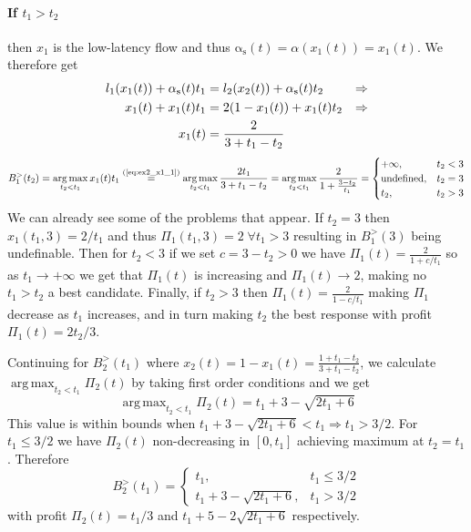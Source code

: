\documentclass[10pt,a4paper]{book}
\newcommand{\indeq}[1]{\stackrel{\text{#1}}{=}}
\newcommand{\as}{\mathrm{\alpha_s}}
\DeclareMathOperator*{\argmax}{arg\,max}
\theoremstyle{definition}
\theoremstyle{comment}
\begin{document}
\paragraph{If $t_1 > t_2$}
then $x_1$ is the low-latency flow and thus $\as(t) = \alpha(x_1(t)) = x_1(t)$.
We therefore get
\begin{align}
	l_1(x_1(t)) + \as(t) t_1 &= l_2(x_2(t)) + \as(t) t_2 &\Rightarrow \notag \\
	x_1(t) + x_1(t) t_1 &= 2 (1 - x_1(t)) + x_1(t) t_2 &\Rightarrow \notag \\
	x_1(t) &= \frac{2}{3 + t_1 - t_2} \label{eq:ex2_x1_1}
\end{align}
\[
	B_1^>(t_2) = \argmax_{t_2 < t_1} x_1(t) t_1 \indeq{(\ref{eq:ex2_x1_1})} \argmax_{t_2 < t_1} \frac{2 t_1}{3 + t_1 - t_2} = \argmax_{t_2 < t_1} \frac{2}{1 + \frac{3 - t_2}{t_1}} =
		\begin{cases}
			+\infty, & t_2 < 3 \\
			\textrm{undefined}, & t_2 = 3 \\
			t_2, & t_2 > 3 \\
		\end{cases}
\]
We can already see some of the problems that appear.
If $t_2 = 3$ then $x_1(t_1, 3) = 2/t_1$ and thus $\Pi_1(t_1, 3) = 2 \; \forall t_1 > 3$ resulting in $B_1^>(3)$ being undefinable.
Then for $t_2 < 3$ if we set $c = 3 - t_2 > 0$ we have $\Pi_1(t) = \frac{2}{1 + c/t_1}$ so as $t_1 \rightarrow +\infty$ we get that $\Pi_1(t)$ is increasing and $\Pi_1(t) \rightarrow 2$, making no $t_1 > t_2$ a best candidate.
Finally, if $t_2 > 3$ then $\Pi_1(t) = \frac{2}{1 - c/t_1}$ making $\Pi_1$ decrease as $t_1$ increases, and in turn making $t_2$ the best response with profit $\Pi_1(t) = {2 t_2}/3$.

Continuing for $B_2^>(t_1)$ where $x_2(t) = 1 - x_1(t) = \frac{1 + t_1 - t_2}{3 + t_1 - t_2}$, we calculate $\argmax_{t_2 < t_1} \Pi_2(t)$ by taking first order conditions and we get
\[\argmax_{t_2 < t_1} \Pi_2(t) = t_1 + 3 - \sqrt{2 t_1 + 6}\]
This value is within bounds when $t_1 + 3 - \sqrt{2 t_1 + 6} < t_1 \Rightarrow t_1 > 3/2$.
For $t_1 \le 3/2$ we have $\Pi_2(t)$ non-decreasing in $[0, t_1]$ achieving maximum at $t_2 = t_1$.
Therefore
\[
	B_2^>(t_1) =
		\begin{cases}
			t_1, & t_1 \le 3/2 \\
			t_1 + 3 - \sqrt{2 t_1 + 6}, & t_1 > 3/2
		\end{cases}
\]
with profit $\Pi_2(t) = t_1/3$ and $t_1 + 5 - 2 \sqrt{2 t_1 + 6}$ respectively.
\end{document}
